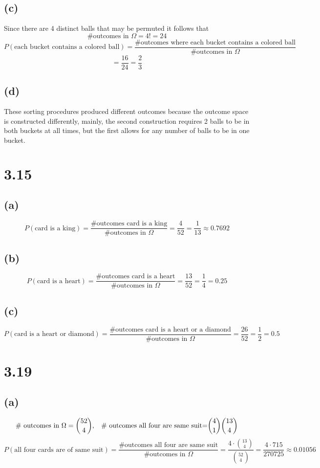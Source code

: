 \documentclass[11pt]{article}
\begin{document}
\subsection*{(c)}
Since there are 4 distinct balls that may be permuted it follows that
\[\text{\# outcomes in }\Omega=4!=24\]
\[P(\text{each bucket contains a colored ball})=\frac{\text{\# outcomes where each bucket contains a colored ball}}{\text{\# outcomes in }\Omega}\]
\[=\frac{16}{24}=\frac{2}{3}\]
\subsection*{(d)}
These sorting procedures produced different outcomes because the outcome space is constructed differently, mainly, the second construction requires 2 balls to be in both buckets at all times, but the first allows for any number of balls to be in one bucket.
\section*{3.15}
\subsection*{(a)}
\[P(\text{card is a king})=\frac{\text{\# outcomes card is a king}}{\text{\# outcomes in }\Omega}=\frac{4}{52}=\frac{1}{13}\approx 0.7692\]
\subsection*{(b)}
\[P(\text{card is a heart})=\frac{\text{\# outcomes card is a heart}}{\text{\# outcomes in }\Omega}=\frac{13}{52}=\frac{1}{4}=0.25\]
\subsection*{(c)}
\[P(\text{card is a heart or diamond})=\frac{\text{\# outcomes card is a heart or a diamond}}{\text{\# outcomes in }\Omega}=\frac{26}{52}=\frac{1}{2}=0.5\]
\section*{3.19}
\subsection*{(a)}
\[\text{\# outcomes in }\Omega=\binom{52}{4},\hspace{3mm}\text{\# outcomes all four are same suit=}\binom{4}{1}\binom{13}{4}\]
\[P(\text{all four cards are of same suit})=\frac{\text{\# outcomes all four are same suit}}{\text{\# outcomes in }\Omega}=\frac{4\cdot\binom{13}{4}}{\binom{52}{4}}=\frac{4\cdot 715}{270725}\approx 0.01056\]
\end{document}
